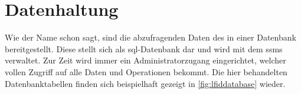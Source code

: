 \section{Datenhaltung}\label{sec:datenhaltung}
	Wie der Name schon sagt,
	sind die abzufragenden Daten des \lfidSystems{} in einer Datenbank bereitgestellt.
	Diese stellt sich als \gls{sql}-Datenbank dar und wird mit dem \gls{ssms} verwaltet.
	Zur Zeit wird immer ein Administratorzugang eingerichtet,
	welcher vollen Zugriff auf alle Daten und Operationen bekommt.
	Die hier behandelten Datenbanktabellen finden sich beispielhaft gezeigt in \vref{fig:lfiddatabase} wieder.